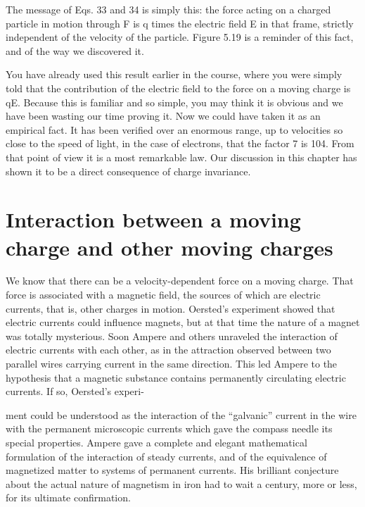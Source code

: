 \begin{equation}
\end{equation}

The message of Eqs. 33 and 34 is simply this: the force acting on a
charged particle in motion through F is q times the electric field E in
that frame, strictly independent of the velocity of the particle.
Figure 5.19 is a reminder of this fact, and of the way we discovered it.

You have already used this result earlier in the course, where you
were simply told that the contribution of the electric field to the force
on a moving charge is qE. Because this is familiar and so simple, you
may think it is obvious and we have been wasting our time proving it.
Now we could have taken it as an empirical fact. It has been verified
over an enormous range, up to velocities so close to the speed of light,
in the case of electrons, that the factor 7 is 104. From that point of
view it is a most remarkable law. Our discussion in this chapter has
shown it to be a direct consequence of charge invariance.

\section{Interaction between a moving charge and other moving charges}

We know that there can be a velocity-dependent force on a moving
charge. That force is associated with a magnetic field, the sources of
which are electric currents, that is, other charges in motion.
Oersted's experiment showed that electric currents could influence
magnets, but at that time the nature of a magnet was totally
mysterious. Soon Ampere and others unraveled the interaction of
electric currents with each other, as in the attraction observed between
two parallel wires carrying current in the same direction. This
led Ampere to the hypothesis that a magnetic substance contains
permanently circulating electric currents. If so, Oersted's experi-

ment could be understood as the interaction of the ``galvanic'' current
in the wire with the permanent microscopic currents which gave
the compass needle its special properties. Ampere gave a complete
and elegant mathematical formulation of the interaction of steady
currents, and of the equivalence of magnetized matter to systems of
permanent currents. His brilliant conjecture about the actual nature
of magnetism in iron had to wait a century, more or less, for its
ultimate confirmation.

